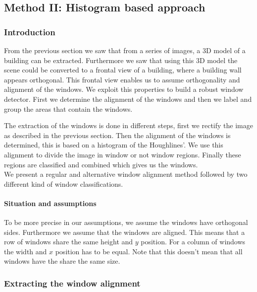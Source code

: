 


\subsection{Method II: Histogram based approach} 
\subsubsection{Introduction}
From the previous section we saw that from a series of images, a 3D model of a
building can be extracted. Furthermore we saw that using this 3D model the
scene could be converted to a frontal view of a building, where a building wall
appears orthogonal.  This frontal view enables us to assume orthogonality and
alignment of the windows. 
We exploit this properties to build a robust window detector. First we determine
the alignment of the windows and then we label and group the areas that
contain the windows. 


The extraction of the windows is done in different steps, first we rectify the
image as described in the previous section.  Then the alignment of the windows
is determined, this is based on a histogram of the Houghlines'. We use this
alignment to divide the image in window or not window regions.  Finally these
regions are classified and combined which gives us the windows.\\
We present a regular and alternative window alignment method
followed by two different kind of window classifications. 


\paragraph{Situation and assumptions}
To be more precise in our assumptions, we assume the windows have orthogonal
sides.  Furthermore we assume that the windows are aligned. This means that a
row of windows share the same height and $y$ position. For a column of windows
the width and $x$ position has to be equal.  Note that this doesn't mean that
all windows have the share the same size.



\subsubsection{Extracting the window alignment}
